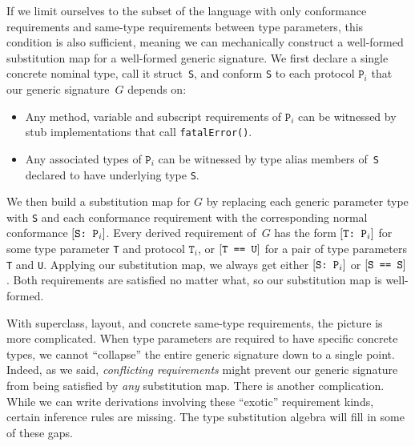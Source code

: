 \documentclass[../generics]{subfiles}
\begin{document}
If we limit ourselves to the subset of the language with only conformance requirements and same-type requirements between type parameters, this condition is also sufficient, meaning we can mechanically construct a well-formed substitution map for a well-formed generic signature. We first declare a single concrete nominal type, call it struct~\texttt{S}, and conform \texttt{S} to each protocol $\texttt{P}_i$ that our generic signature~$G$ depends on:
\begin{itemize}
\item Any method, variable and subscript requirements of $\texttt{P}_i$ can be witnessed by stub implementations that call \texttt{fatalError()}.
\item Any associated types of $\texttt{P}_i$ can be witnessed by type alias members of~\texttt{S} declared to have underlying type \texttt{S}.
\end{itemize}
We then build a substitution map for $G$ by replacing each generic parameter type with \texttt{S} and each conformance requirement with the corresponding normal conformance $[\texttt{S:~$\texttt{P}_i$}]$. Every derived requirement of~$G$ has the form $[\texttt{T:~$\texttt{P}_i$}]$ for some type parameter \texttt{T} and protocol $\texttt{T}_i$, or $[\texttt{T == U}]$ for a pair of type parameters \texttt{T} and \texttt{U}. Applying our substitution map, we always get either $[\texttt{S:~$\texttt{P}_i$}]$ or $[\texttt{S == S}]$. Both requirements are satisfied no matter what, so our substitution map is well-formed.

With superclass, layout, and concrete same-type requirements, the picture is more complicated. When type parameters are required to have specific concrete types, we cannot ``collapse'' the entire generic signature down to a single point. Indeed, as we said, \emph{conflicting requirements} might prevent our generic signature from being satisfied by \emph{any} substitution map. There is another complication. While we can write derivations involving these ``exotic'' requirement kinds, certain inference rules are missing. The type substitution algebra will fill in some of these gaps.
\end{document}
